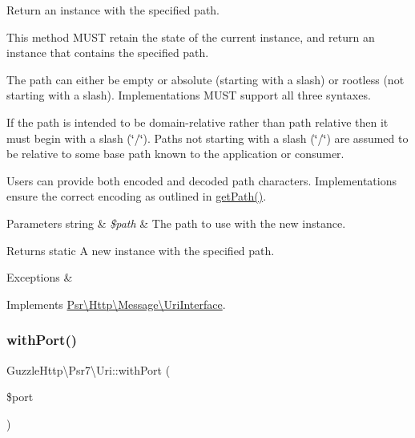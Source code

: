 Return an instance with the specified path.

This method M\+U\+ST retain the state of the current instance, and return an instance that contains the specified path.

The path can either be empty or absolute (starting with a slash) or rootless (not starting with a slash). Implementations M\+U\+ST support all three syntaxes.

If the path is intended to be domain-\/relative rather than path relative then it must begin with a slash (\char`\"{}/\char`\"{}). Paths not starting with a slash (\char`\"{}/\char`\"{}) are assumed to be relative to some base path known to the application or consumer.

Users can provide both encoded and decoded path characters. Implementations ensure the correct encoding as outlined in \hyperlink{classGuzzleHttp_1_1Psr7_1_1Uri_a063016fa7af70993d74f3c4efa4e9246}{get\+Path()}.


\begin{DoxyParams}[1]{Parameters}
string & {\em \$path} & The path to use with the new instance. \\
\hline
\end{DoxyParams}
\begin{DoxyReturn}{Returns}
static A new instance with the specified path. 
\end{DoxyReturn}

\begin{DoxyExceptions}{Exceptions}
{\em } & \\
\hline
\end{DoxyExceptions}


Implements \hyperlink{interfacePsr_1_1Http_1_1Message_1_1UriInterface_a9d2a8bda965816471ea40e3560d710ca}{Psr\textbackslash{}\+Http\textbackslash{}\+Message\textbackslash{}\+Uri\+Interface}.

\mbox{\label{classGuzzleHttp_1_1Psr7_1_1Uri_af06111c4b19c09ce8f1902b803016950}} 
\subsubsection{\texorpdfstring{with\+Port()}{withPort()}}
{\footnotesize\ttfamily Guzzle\+Http\textbackslash{}\+Psr7\textbackslash{}\+Uri\+::with\+Port (\begin{DoxyParamCaption}\item[{}]{\$port }\end{DoxyParamCaption})}

